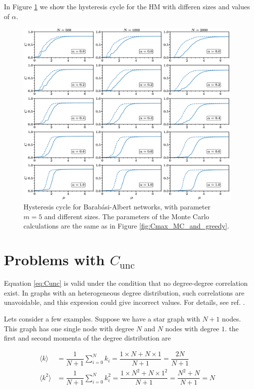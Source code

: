 \documentclass{article}
\begin{document}
In Figure \ref{fig:Cmax_MC_and_greedy_HM} we show the hysteresis cycle for the HM with differen sizes and values of $\alpha$.

\begin{figure}[ht!]
\centering
\includegraphics[scale=0.27]{./figs/Cmax_MC_and_greedy_HM}
\caption{Hysteresis cycle for Barab\'asi-Albert networks, with parameter $m = 5$ and different sizes. The parameters of the Monte Carlo calculations are the same as in Figure \ref{fig:Cmax_MC_and_greedy}.}
\label{fig:Cmax_MC_and_greedy_HM}
\end{figure}

\appendix
\section{Problems with $C_{\mathrm{unc}}$} \label{app:Cunc}

Equation \ref{eq:Cunc} is valid under the condition that no degree-degree correlation exist. In graphs with an heterogeneous degree distribution, such correlations are unavoidable, and this expresion could give incorrect values. For details, see ref. \cite{Newman2003WhyNetworks}.

Lets consider a few examples. Suppose we have a star graph with $N+1$ nodes. This graph has one single node with degree $N$ and $N$ nodes with degree $1$. the first and second momenta of the degree distribution are 

\begin{align}
    \langle k \rangle &= \dfrac{1}{N+1} \sum_{i=0}^N k_i = \dfrac{1\times N + N \times 1}{N+1} = \dfrac{2N}{N+1} \nonumber \\
    \langle k^2 \rangle &= \dfrac{1}{N+1} \sum_{i=0}^N k_i^2 = \dfrac{1\times N^2 + N \times 1^2}{N+1} = \dfrac{N^2 + N}{N+1} = N
\end{align}
\end{document}

